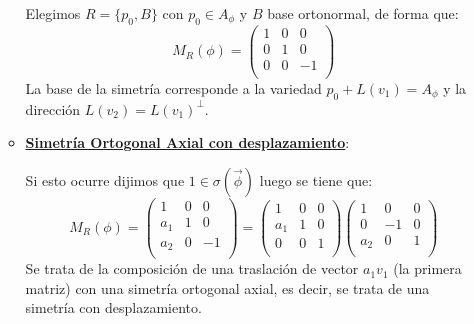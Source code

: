 \documentclass[10pt,a4paper,openright]{book}
\theoremstyle{break}
\begin{document}
\begin{itemize}
\begin{itemize}
	Elegimos $R=\{p_0, B\}$ con $p_0\in A_\phi$ y $B$ base ortonormal, de forma que:
	$$M_R (\phi) = \left(\begin{array}{c|cc} 1 & 0  & 0  \\ \hline 0 & 1 & 0 \\0 & 0 & -1 \\ \end{array} \right)$$
	La base de la simetría corresponde a la variedad $p_0 + L(v_1) = A_\phi$ y la dirección $L(v_2) = L(v_1)^\perp$.

	\item \underline{\textbf{Simetría Ortogonal Axial con desplazamiento}}: 
	
	Si esto ocurre dijimos que $1 \in \sigma(\vec{\phi})$ luego se tiene que:
	$$M_R (\phi) = \left(\begin{array}{c|cc} 1 & 0  & 0  \\ \hline a_1 & 1 & 0 \\ a_2 & 0 & -1 \\ \end{array} \right) = \left(\begin{array}{c|cc} 1 & 0  & 0  \\ \hline a_1 & 1 & 0 \\ 0 & 0 & 1 \\ \end{array} \right)\left(\begin{array}{c|cc} 1 & 0  & 0  \\ \hline 0 & -1 & 0 \\ a_2 & 0 & 1 \\\end{array} \right)$$
	Se trata de la composición de una traslación de vector $a_1 v_1$ (la primera matriz) con una simetría ortogonal axial, es decir, se trata de una simetría con desplazamiento.
	\end{itemize}
\end{itemize}
\end{document}
